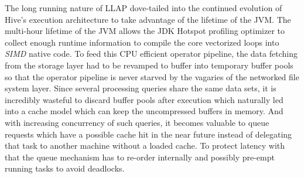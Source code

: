 The long running nature of LLAP dove-tailed into the continued evolution of Hive's execution architecture to take advantage of the lifetime of the JVM. The multi-hour 
lifetime of the JVM allows the JDK Hotspot profiling optimizer to collect enough runtime information
to compile the core vectorized loops into \emph{SIMD} native code. To feed this CPU efficient operator pipeline, the data fetching from the storage layer
had to be revamped to buffer into temporary buffer pools so that the operator pipeline is never starved by the vagaries of the networked file
system layer. Since several processing queries share the same data sets, it is incredibly wasteful to discard buffer pools after execution which
naturally led into a cache model which can keep the uncompressed buffers in memory. And with increasing concurrency of such queries, it becomes valuable
to queue requests which have a possible cache hit in the near future instead of delegating that task to another machine without a loaded cache. To protect
latency with that the queue mechanism has to re-order internally and possibly pre-empt running tasks to avoid deadlocks. 

